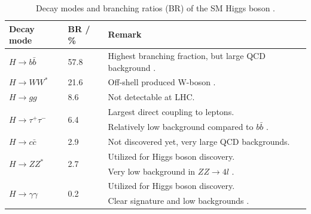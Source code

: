 \begin{table}[!]
    \centering
    \caption[Higgs boson decay mode branching ratios.]{Decay modes and branching ratios (BR) of the SM Higgs boson \cite{Patrignani:2016xqp}.}\label{theory:higgs:decay}
    \begin{tabular}{lll}
    \toprule
    Decay mode                  & BR / \% & Remark                                                                                \\ \hline
    $H\rightarrow b\bar{b}$     & 57.8                    & Highest branching fraction, but large QCD background \cite{hbb}.                                  \\
    $H\rightarrow WW^*$         & 21.6                    & Off-shell produced W-boson \cite{ATLAS:2014aga}.                     \\
    $H\rightarrow gg$           & 8.6                     & Not detectable at LHC.                                                                \\
    \multirow{2}{*}{$H\rightarrow \tau^+\tau^-$ } & \multirow{2}{*}{6.4}                     & Largest direct coupling to leptons. \\
                            &                                         & Relatively low background compared to $b\bar{b}$ \cite{Sirunyan:2017khh}. \\
    $H\rightarrow c\bar{c}$     & 2.9                     & Not discovered yet, very large QCD backgrounds.                                        \\
    \multirow{2}{*}{$H\rightarrow ZZ^*$  }       & \multirow{2}{*}{2.7}                     & Utilized for Higgs boson discovery.                                           \\
                                            &                         & Very low background in $ZZ\rightarrow 4l$ \cite{Aad:2012tfa,Chatrchyan:2012xdj}.   \\
    \multirow{2}{*}{$H\rightarrow \gamma\gamma$} & \multirow{2}{*}{0.2}                     & Utilized for Higgs boson discovery.  \\
                                            &                         & Clear signature and low backgrounds \cite{Aad:2012tfa,Chatrchyan:2012xdj}.    \\  \bottomrule                                                  
    \end{tabular}
\end{table}

